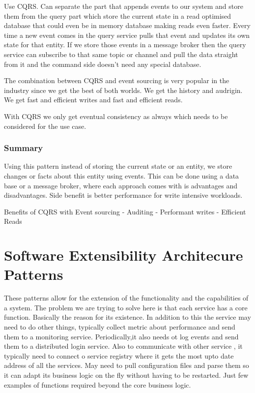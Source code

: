 \documentclass[a4paper, 11pt]{book}
\begin{document}
    Use CQRS.
    Can separate the part that appends events to our system and store them from the query part which store the current state in a read optimised database that could even be in memory database making reads even faster.
    Every time a new event comes in the query service pulls that event and updates its own state for that entity.
    If we store those events in a message broker then the query service can subscribe to that same topic or channel and pull the data straight from it and the command side doesn't need any special database.

    The combination between CQRS and event sourcing is very popular in the industry since we get the best of both worlds.
    We get the history and audrigin.
    We get fast and efficient writes and fast and efficient reads.

    With CQRS we only get eventual consistency as always which needs to be considered for the use case.

    \subsubsection{Summary}
    Using this pattern instead of storing the current state or an entity, we store changes or facts about this entity using events.
    This can be done using a data base or a message broker, where each approach comes with is advantages and disadvantages.
    Side benefit is better performance for write intensive workloads.

    Benefits of CQRS with Event sourcing
    - Auditing
    - Performant writes
    - Efficient Reads

    \section{Software Extensibility Architecure Patterns}

    These patterns allow for the extension of the functionality and the capabilities of a system.
    The problem we are trying to solve here is that each service has a core function.
    Basically the reason for its existence.
    In addition to this the service may need to do other things, typically collect metric about performance and send them to a monitoring service.
    Periodically,it also needs ot log events and send them to a distributed login service.
    Also to communicate with other service , it typically need to connect o service registry where it gets the most upto date address of all the services.
    May need to pull configuration files and parse them so it can adapt its business logic on the fly without having to be restarted.
    Just few examples of functions required beyond the core business logic.
\end{document}
